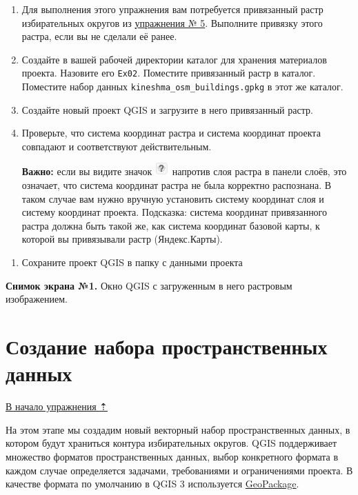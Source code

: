\documentclass[
  12pt,
]{book}
\providecommand{\tightlist}{%
  \setlength{\itemsep}{0pt}\setlength{\parskip}{0pt}}
\begin{document}
\begin{enumerate}
\def\labelenumi{\arabic{enumi}.}
\item
  Для выполнения этого упражнения вам потребуется привязанный растр избирательных округов из \protect\hyperlink{raster-reference-linear}{упражнения № 5}. Выполните привязку этого растра, если вы не сделали её ранее.
\item
  Создайте в вашей рабочей директории каталог для хранения материалов проекта. Назовите его \texttt{Ex02}. Поместите привязанный растр в каталог. Поместите набор данных \texttt{kineshma\_osm\_buildings.gpkg} в этот же каталог.
\item
  Создайте новый проект QGIS и загрузите в него привязанный растр.
\item
  Проверьте, что система координат растра и система координат проекта совпадают и соответствуют действительным.

  \textbf{Важно:} если вы видите значок \includegraphics{images/Ex05_Vectorization/unknown_crs.png} напротив слоя растра в панели слоёв, это означает, что система координат растра не была корректно распознана. В таком случае вам нужно вручную установить систему координат слоя и систему координат проекта. Подсказка: система координат привязанного растра должна быть такой же, как система координат базовой карты, к которой вы привязывали растр (Яндекс.Карты).
\end{enumerate}

\begin{enumerate}
\def\labelenumi{\arabic{enumi}.}
\setcounter{enumi}{4}
\tightlist
\item
  Сохраните проект QGIS в папку с данными проекта
\end{enumerate}

\textbf{Снимок экрана №1.} Окно QGIS с загруженным в него растровым изображением.

\hypertarget{digitizing-new-geopackage}{%
\section{Создание набора пространственных данных}\label{digitizing-new-geopackage}}

\protect\hyperlink{digitizingf-districts}{В начало упражнения ⇡}

На этом этапе мы создадим новый векторный набор пространственных данных, в котором будут храниться контура избирательных округов. QGIS поддерживает множество форматов пространственных данных, выбор конкретного формата в каждом случае определяется задачами, требованиями и ограничениями проекта. В качестве формата по умолчанию в QGIS 3 используется \href{https://www.geopackage.org/}{GeoPackage}.
\end{document}
